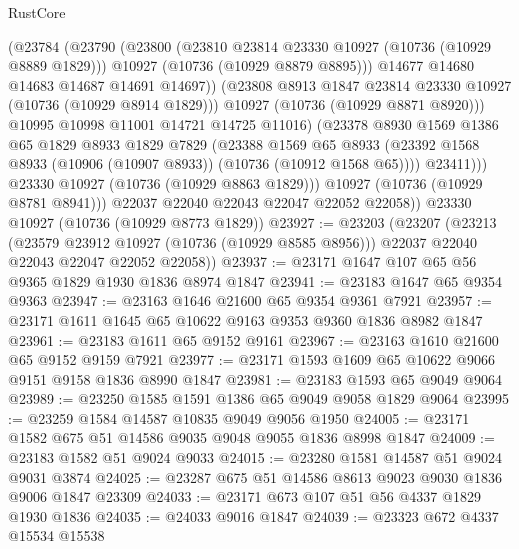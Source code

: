 \begin{lexlean}{RustCore}
\begin{coremodule}
                    (@23784
                      (@23790
                        (@23800
                          (@23810 @23814 @23330 @10927 (@10736 (@10929 @8889 @1829)))
                          @10927
                          (@10736 (@10929 @8879 @8895)))
                        @14677
                        @14680
                        @14683
                        @14687
                        @14691
                        @14697))
                    (@23808 @8913 @1847 @23814 @23330 @10927 (@10736 (@10929 @8914 @1829)))
                    @10927
                    (@10736 (@10929 @8871 @8920)))
                  @10995
                  @10998
                  @11001
                  @14721
                  @14725
                  @11016)
                (@23378
                  @8930
                  @1569
                  @1386
                  @65
                  @1829
                  @8933
                  @1829
                  @7829
                  (@23388
                    @1569
                    @65
                    @8933
                    (@23392 @1568 @8933 (@10906 (@10907 @8933)) (@10736 (@10912 @1568 @65))))
                  @23411)))
            @23330
            @10927
            (@10736 (@10929 @8863 @1829)))
          @10927
          (@10736 (@10929 @8781 @8941)))
        @22037
        @22040
        @22043
        @22047
        @22052
        @22058))
    @23330
    @10927
    (@10736 (@10929 @8773 @1829))
@23927 := @23203
    (@23207
      (@23213
        (@23579 @23912 @10927 (@10736 (@10929 @8585 @8956)))
        @22037
        @22040
        @22043
        @22047
        @22052
        @22058))
@23937 := @23171 @1647 @107 @65 @56 @9365 @1829 @1930 @1836 @8974 @1847
@23941 := @23183 @1647 @65 @9354 @9363
@23947 := @23163 @1646 @21600 @65 @9354 @9361 @7921
@23957 := @23171 @1611 @1645 @65 @10622 @9163 @9353 @9360 @1836 @8982 @1847
@23961 := @23183 @1611 @65 @9152 @9161
@23967 := @23163 @1610 @21600 @65 @9152 @9159 @7921
@23977 := @23171 @1593 @1609 @65 @10622 @9066 @9151 @9158 @1836 @8990 @1847
@23981 := @23183 @1593 @65 @9049 @9064
@23989 := @23250 @1585 @1591 @1386 @65 @9049 @9058 @1829 @9064
@23995 := @23259 @1584 @14587 @10835 @9049 @9056 @1950
@24005 := @23171 @1582 @675 @51 @14586 @9035 @9048 @9055 @1836 @8998 @1847
@24009 := @23183 @1582 @51 @9024 @9033
@24015 := @23280 @1581 @14587 @51 @9024 @9031 @3874
@24025 := @23287 @675 @51 @14586 @8613 @9023 @9030 @1836 @9006 @1847 @23309
@24033 := @23171 @673 @107 @51 @56 @4337 @1829 @1930 @1836
@24035 := @24033 @9016 @1847
@24039 := @23323 @672 @4337 @15534 @15538

\end{coremodule}
\end{lexlean}
